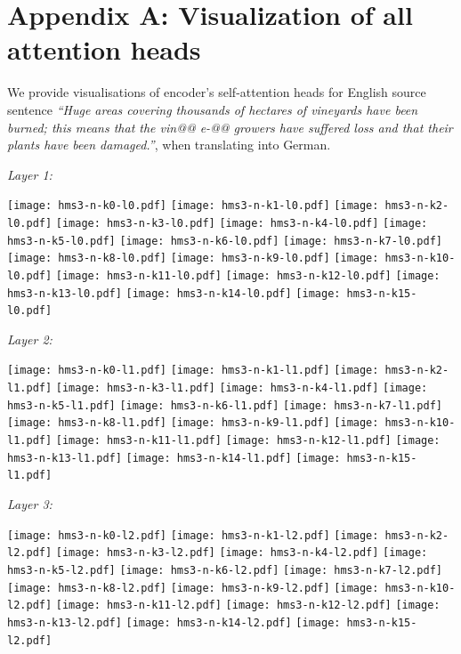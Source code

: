 \documentclass[11pt,a4paper]{article}
\begin{document}
\section*{Appendix A: Visualization of all attention heads}
We provide visualisations of encoder's self-attention heads for English source sentence
\emph{``Huge areas covering thousands of hectares of vineyards have been burned; this means that the vin@@ e-@@ growers have suffered loss and that their plants have been damaged.''},
when translating into German.
\begin{flushleft}
\bigskip
\emph{Layer 1:}

\texttt{[image: hms3-n-k0-l0.pdf]}
\texttt{[image: hms3-n-k1-l0.pdf]}
\texttt{[image: hms3-n-k2-l0.pdf]}
\texttt{[image: hms3-n-k3-l0.pdf]}
\texttt{[image: hms3-n-k4-l0.pdf]}
\texttt{[image: hms3-n-k5-l0.pdf]}
\texttt{[image: hms3-n-k6-l0.pdf]}
\texttt{[image: hms3-n-k7-l0.pdf]}
\texttt{[image: hms3-n-k8-l0.pdf]}
\texttt{[image: hms3-n-k9-l0.pdf]}
\texttt{[image: hms3-n-k10-l0.pdf]}
\texttt{[image: hms3-n-k11-l0.pdf]}
\texttt{[image: hms3-n-k12-l0.pdf]}
\texttt{[image: hms3-n-k13-l0.pdf]}
\texttt{[image: hms3-n-k14-l0.pdf]}
\texttt{[image: hms3-n-k15-l0.pdf]}

\bigskip
\emph{Layer 2:}

\texttt{[image: hms3-n-k0-l1.pdf]}
\texttt{[image: hms3-n-k1-l1.pdf]}
\texttt{[image: hms3-n-k2-l1.pdf]}
\texttt{[image: hms3-n-k3-l1.pdf]}
\texttt{[image: hms3-n-k4-l1.pdf]}
\texttt{[image: hms3-n-k5-l1.pdf]}
\texttt{[image: hms3-n-k6-l1.pdf]}
\texttt{[image: hms3-n-k7-l1.pdf]}
\texttt{[image: hms3-n-k8-l1.pdf]}
\texttt{[image: hms3-n-k9-l1.pdf]}
\texttt{[image: hms3-n-k10-l1.pdf]}
\texttt{[image: hms3-n-k11-l1.pdf]}
\texttt{[image: hms3-n-k12-l1.pdf]}
\texttt{[image: hms3-n-k13-l1.pdf]}
\texttt{[image: hms3-n-k14-l1.pdf]}
\texttt{[image: hms3-n-k15-l1.pdf]}

\emph{Layer 3:}

\texttt{[image: hms3-n-k0-l2.pdf]}
\texttt{[image: hms3-n-k1-l2.pdf]}
\texttt{[image: hms3-n-k2-l2.pdf]}
\texttt{[image: hms3-n-k3-l2.pdf]}
\texttt{[image: hms3-n-k4-l2.pdf]}
\texttt{[image: hms3-n-k5-l2.pdf]}
\texttt{[image: hms3-n-k6-l2.pdf]}
\texttt{[image: hms3-n-k7-l2.pdf]}
\texttt{[image: hms3-n-k8-l2.pdf]}
\texttt{[image: hms3-n-k9-l2.pdf]}
\texttt{[image: hms3-n-k10-l2.pdf]}
\texttt{[image: hms3-n-k11-l2.pdf]}
\texttt{[image: hms3-n-k12-l2.pdf]}
\texttt{[image: hms3-n-k13-l2.pdf]}
\texttt{[image: hms3-n-k14-l2.pdf]}
\texttt{[image: hms3-n-k15-l2.pdf]}


\end{flushleft}
\end{document}
